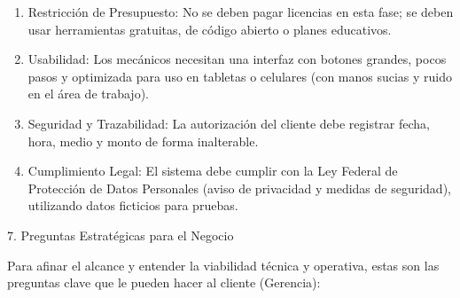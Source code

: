 \documentclass[
  spanish,
  11pt,
  letterpaper,
]{article}
\begin{document}
\begin{itemize}
  \begin{enumerate}
  \def\labelenumi{\arabic{enumi}.}
  \item
    Restricción de Presupuesto: No se deben pagar licencias en esta
    fase; se deben usar herramientas gratuitas, de código abierto o
    planes educativos.
  \item
    Usabilidad: Los mecánicos necesitan una interfaz con botones
    grandes, pocos pasos y optimizada para uso en tabletas o celulares
    (con manos sucias y ruido en el área de trabajo).
  \item
    Seguridad y Trazabilidad: La autorización del cliente debe registrar
    fecha, hora, medio y monto de forma inalterable.
  \item
    Cumplimiento Legal: El sistema debe cumplir con la Ley Federal de
    Protección de Datos Personales (aviso de privacidad y medidas de
    seguridad), utilizando datos ficticios para pruebas.
  \end{enumerate}
\end{itemize}

7. Preguntas Estratégicas para el Negocio

Para afinar el alcance y entender la viabilidad técnica y operativa,
estas son las preguntas clave que le pueden hacer al cliente (Gerencia):
\end{document}
